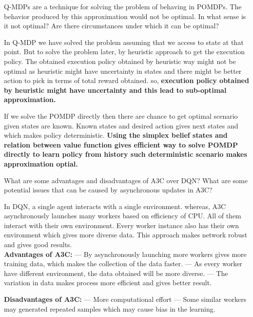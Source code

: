 \documentclass[solution,addpoints,12pt]{exam}
\begin{document}
\begin{questions}
\begin{solution}
\end{solution}


\question[3]
Q-MDPs are a technique for solving the problem of behaving in POMDPs. The behavior produced by this approximation would not be optimal. In what sense is it not optimal?  Are there circumstances under which it can be optimal?

\begin{solution}
	In Q-MDP we have solved the problem assuming that we access to state at that point. But to solve the problem later, by heuristic approach to get the execution policy. The obtained execution policy obtained by heuristic way might not be optimal as heuristic might have uncertainty in states and there might be better action to pick in terms of total reward obtained. so,\textbf{ execution policy obtained by heuristic might have uncertainty and this lead to sub-optimal approximation.}
	
	If we solve the POMDP directly then there are chance to get optimal scenario given states are known. Known states and desired action gives next states and which makes policy deterministic. \textbf{Using the simplex belief states and relation between value function gives efficient way to solve POMDP directly to learn policy from history such deterministic scenario makes approximation optial.}
\end{solution}

\question[3] What are some advantages and disadvantages of A3C over DQN? What are some potential issues that can be caused by asynchronous updates in A3C?

\begin{solution}
In DQN, a single agent interacts with a single environment. whereas, A3C asynchronously launches many workers  based on efficiency of CPU. All of them interact with their own environment. Every worker instance also has their own environment which gives more diverse data. This approach makes network robust and gives good results.\\
\textbf{Advantages of A3C:}
 \subitem --- By asynchronously launching more workers gives more training data, which makes the collection of the data faster.
 \subitem --- As every worker have different environment, the data obtained will be more diverse. 
 \subitem --- The variation in data makes process more efficient and gives better result. 
 
 \textbf{Disadvantages of A3C:}
 \subitem --- More computational effort 
 \subitem --- Some similar workers may generated repeated samples which may cause bias in the learning.
 

\end{solution}
\end{questions}
\end{document}
